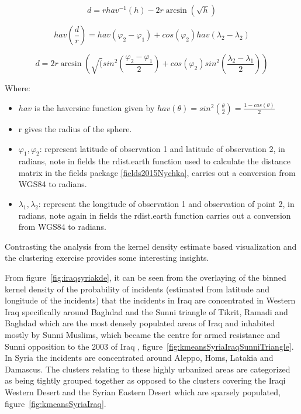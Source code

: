 \begin{equation} d = r hav^{-1}(h) - 2r\arcsin(\sqrt{h})  \label{eq:haversine1}  \end{equation}

\begin{equation} hav(\frac{d}{r}) =hav(\varphi_{2}-\varphi_{1})+cos(\varphi_{2})hav(\lambda_{2}-\lambda_{2})  \label{eq:haversine2}  \end{equation}

\begin{equation} d=2r \arcsin(\sqrt(sin^{2}(\frac{\varphi_2-\varphi_1}{2})+cos(\varphi_2)sin^{2}(\frac{\lambda_2-\lambda_1}{2}))  \label{eq:haversine3}  \end{equation}

Where:
\begin{itemize}
\item[]  $hav$ is the haversine function given by $hav(\theta)=sin^2(\frac{\theta}{2})=\frac{1-cos(\theta)}{2}$
\item[] r gives the radius of the sphere.
\item[] $\varphi_1, \varphi_2$: represent latitude of observation 1 and latitude of observation 2, in radians, note in fields the rdist.earth function used to calculate the distance matrix in the fields package \ref{fields2015Nychka}, carries out a conversion from WGS84 \citep{misra1996integrated} to radians.
\item[]  $\lambda_1,\lambda_2$: represent the longitude of observation 1 and observation of point 2, in radians, note again in fields the rdist.earth function carries out a conversion from WGS84 \citep{misra1996integrated} to radians.
\end{itemize}

Contrasting the analysis from the kernel density estimate based visualization and the clustering exercise provides some interesting insights.
   
From figure~\ref{fig:iraqsyriakde}, it can be seen from the overlaying of the binned kernel density of the probability of incidents (estimated from latitude and longitude of the incidents) that the incidents in Iraq are concentrated in Western Iraq specifically around Baghdad and the Sunni triangle \citep{rand2015iraq} of Tikrit, Ramadi and Baghdad which are the most densely populated areas of Iraq and inhabited mostly by Sunni Muslims, which became the centre for armed resistance and Sunni opposition to the 2003 of Iraq \citep{hashim2005insurgency}, figure~\ref{fig:kmeansSyriaIraqSunniTriangle}. In Syria the incidents are concentrated around Aleppo, Homs, Latakia and Damascus. The clusters relating to these highly urbanized areas are categorized as being tightly grouped together as opposed to the clusters covering the Iraqi Western Desert and the Syrian Eastern Desert which are sparsely populated, figure~\ref{fig:kmeansSyriaIraq}.


